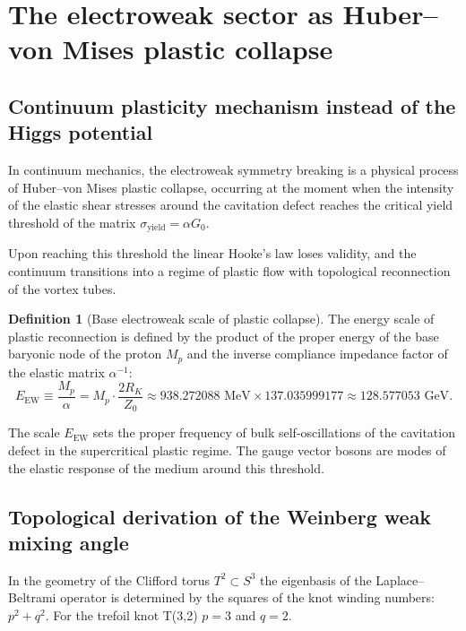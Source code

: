 \documentclass[11pt,a4paper]{article}
\theoremstyle{definition}
\newtheorem{definition}{Definition}
\theoremstyle{remark}
\begin{document}
\section{The electroweak sector as Huber--von Mises plastic collapse}
	
\subsection{Continuum plasticity mechanism instead of the Higgs potential}
	
In continuum mechanics, the electroweak symmetry breaking is a physical process of Huber--von Mises plastic collapse, occurring at the moment when the intensity of the elastic shear stresses around the cavitation defect reaches the critical yield threshold of the matrix $\sigma_{\mathrm{yield}} = \alpha G_0$.
	
Upon reaching this threshold the linear Hooke's law loses validity, and the continuum transitions into a regime of plastic flow with topological reconnection of the vortex tubes.
	
\begin{definition}[Base electroweak scale of plastic collapse]
The energy scale of plastic reconnection is defined by the product of the proper energy of the base baryonic node of the proton $M_p$ and the inverse compliance impedance factor of the elastic matrix $\alpha^{-1}$:
\begin{equation}
	E_{\mathrm{EW}} \equiv \frac{M_p}{\alpha} = M_p \cdot \frac{2 R_K}{Z_0} \approx 938.272088\text{ MeV} \times 137.035999177 \approx 128.577053\text{ GeV}.
\label{eq:electroweak_scale_exact}
\end{equation}
\end{definition}
	
The scale $E_{\mathrm{EW}}$ sets the proper frequency of bulk self-oscillations of the cavitation defect in the supercritical plastic regime. The gauge vector bosons are modes of the elastic response of the medium around this threshold.
	
\subsection{Topological derivation of the Weinberg weak mixing angle}
	
In the geometry of the Clifford torus $T^2 \subset S^3$ the eigenbasis of the Laplace--Beltrami operator is determined by the squares of the knot winding numbers: $p^2 + q^2$. For the trefoil knot T(3,2) $p=3$ and $q=2$.
	
\end{document}
